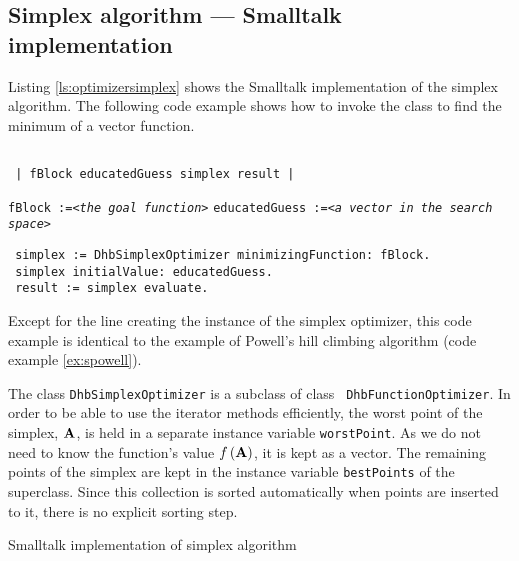 \documentclass[twoside]{book}
\begin{document}
\subsection{Simplex algorithm --- Smalltalk implementation}
 Listing \ref{ls:optimizersimplex} shows
the Smalltalk implementation of the simplex algorithm. The
following code example shows how to invoke the class to find the
minimum of a vector function.
\begin{codeExample}
\begin{verbatim}

 | fBlock educatedGuess simplex result |
\end{verbatim}
 {\tt fBlock :=<\sl the goal function\tt >}\hfil\break
 {\tt educatedGuess :=<\sl a vector in the search space\tt >}
\begin{verbatim}
 simplex := DhbSimplexOptimizer minimizingFunction: fBlock.
 simplex initialValue: educatedGuess.
 result := simplex evaluate.
\end{verbatim}
\end{codeExample}
Except for the line creating the instance of the simplex
optimizer, this code example is identical to the example of
Powell's hill climbing algorithm (code example \ref{ex:spowell}).

The class {\tt DhbSimplexOptimizer} is a subclass of class {\tt
DhbFunctionOptimizer}. In order to be able to use the iterator
methods efficiently, the worst point of the simplex, ${\bf A}$, is
held in a separate instance variable {\tt worstPoint}. As we do
not need to know the function's value $f\left({\bf A}\right)$, it
is kept as a vector. The remaining points of the simplex are kept
in the instance variable {\tt bestPoints} of the superclass. Since
this collection is sorted automatically when points are inserted
to it, there is no explicit sorting step.

\begin{listing} Smalltalk implementation of simplex algorithm
\label{ls:optimizersimplex}

\end{listing}
\end{document}
